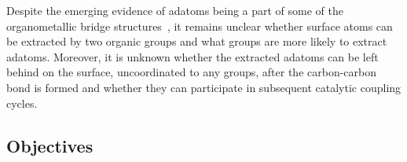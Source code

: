 \documentclass[journal=jacsat,manuscript=article]{achemso}
\newcommand{\lock}{\color{red}}
\newcommand{\lock}{\color{black}}
\begin{document}
\fi
{\lock

Despite the emerging evidence of adatoms being a part of some of the organometallic bridge structures~\cite{acsnano2017, acsnano2019}, it remains unclear whether surface atoms can be extracted by two organic groups and what groups are more likely to extract adatoms. Moreover, it is unknown whether the extracted adatoms can be left behind on the surface, uncoordinated to any groups, after the carbon-carbon bond is formed and whether they can participate in subsequent catalytic coupling cycles.


}

\ifdefined\INTERNAL

\subsection{Objectives}

\fi
\end{document}
